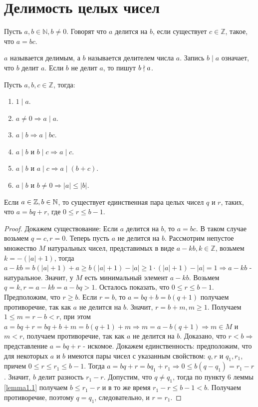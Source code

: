 \section{Делимость целых чисел}
    \begin{definition}
        Пусть $a,b\in \mathbb{N}, b\ne 0$. Говорят что $a$ делится на $b$, если существует $c\in \mathbb{Z}$, такое, что $a=bc$.
    \end{definition}
    \begin{comm}
        $a$ называется делимым, а $b$ называется делителем числа $a$. Запись $b \mid a$ означает, что $b$ делит $a$. Если $b$ не делит $a$, то пишут $b\nmid a$.
    \end{comm}
    \begin{lemma} \label{lemma1.1}
        Пусть $a,b,c \in \mathbb{Z}$, тогда:
        \begin{enumerate}
            \item $1 \mid a$.
            \item $a\ne 0 \Rightarrow a\mid a$.
            \item $a\mid b \Rightarrow a\mid bc$.
            \item $a\mid b$ и $b\mid c \Rightarrow a\mid c$.
            \item $a\mid b$ и $a\mid c \Rightarrow a\mid (b+c)$.
            \item $a\mid b$ и $b\ne 0 \Rightarrow |a|\leq|b|$.
        \end{enumerate}
    \end{lemma}
    \begin{theorem} \label{th1.1}
        Если $a\in \mathbb{Z}, b\in \mathbb{N}$, то существует единственная пара целых чисел $q$ и $r$, таких, что $a=bq+r$, где $0\leq r\leq b-1$. 
    \end{theorem}
    \begin{proof}
        Докажем существование: Если $a$ делится на $b$, то $a=bc$. В таком случае возьмем $q=c, r=0$. Теперь пусть $a$ не делится на $b$. Рассмотрим непустое множество $M$ натуральных чисел, представимых в виде $a-kb, k\in \mathbb{Z}$, возьмем $k=-(|a|+1)$, тогда $a-kb=b(|a|+1)+a\geq b(|a|+1)-|a|\geq 1\cdot (|a|+1)-|a|=1 \Rightarrow a-kb$ - натуральное. Значит, у $M$ есть минимальный элемент $a-kb$. Возьмем $q=k, r=a-kb=a-bq > 1$. Осталось показать, что $0\leq r\leq b-1$. Предположим, что $r\geq b$. Если $r=b$, то $a=bq+b=b(q+1)$ получаем противоречие, так как $a$ не делится на $b$. Значит, $r=b+m, m\geq 1$. Получаем $1\leq m=r-b<r$, при этом $a=bq+r=bq+b+m=b(q+1)+m \Rightarrow m=a-b(q+1) \Rightarrow m\in M$ и $m<r$, получаем противоречие, так как $a$ не делится на $b$. Доказано, что $r<b \Rightarrow$ представление $a=bq+r$ - искомое. Докажем единственность: предположим, что для некоторых $a$ и $b$ имеются пары чисел с указанным свойством: $q,r$ и $q_1,r_1$, причем $0\leq r\leq r_1 \leq b-1$. Тогда $a=bq+r=bq_1+r_1\Rightarrow 0\leq b(q-q_1)=r_1-r$. Значит, $b$ делит разность $r_1-r$. Допустим, что $q\ne q_1$, тогда по пункту 6 леммы \ref{lemma1.1} получаем $b\leq r_1-r$ и в то же время $r_1-r\leq b-1<b$. Получаем противоречие, поэтому $q=q_1$, следовательно, и $r=r_1$.
    \end{proof}